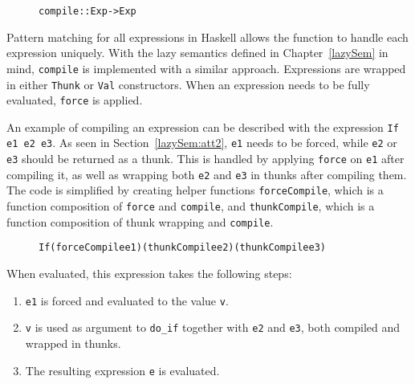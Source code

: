 \begin{figure}[H]
\begin{alltt}
  compile :: Exp -> Exp
\end{alltt}
\end{figure}

\noindent Pattern matching for all expressions in Haskell allows the function to
handle each expression uniquely. With the lazy semantics defined in
Chapter~\ref{lazySem} in mind, \texttt{compile} is implemented with a similar
approach. Expressions are wrapped in either \texttt{Thunk} or
\texttt{Val} constructors. When an expression needs to be fully evaluated,
\texttt{force} is applied.

An example of compiling an expression can be described with the expression
\texttt{If e1 e2 e3}. As seen in Section~\ref{lazySem:att2}, \texttt{e1} needs
to be forced, while \texttt{e2} or \texttt{e3} should be returned as a thunk.
This is handled by applying \texttt{force} on \texttt{e1} after compiling it,
as well as wrapping both \texttt{e2} and \texttt{e3} in thunks after compiling them.
The code is simplified by creating helper functions \texttt{forceCompile},
which is a function composition of \texttt{force} and \texttt{compile}, and
\texttt{thunkCompile}, which is a function composition of thunk wrapping and
\texttt{compile}.

\begin{figure}[H]
\begin{alltt}
  If (forceCompile e1) (thunkCompile e2) (thunkCompile e3)
\end{alltt}
\end{figure}

\noindent When evaluated, this expression takes the following steps:

\begin{enumerate}
\item \texttt{e1} is forced and evaluated to the value \texttt{v}.
\item \texttt{v} is used as argument to \texttt{do\_if} together with \texttt{e2} and \texttt{e3}, both compiled and wrapped in thunks.
\item The resulting expression \texttt{e} is evaluated.
\end{enumerate}

